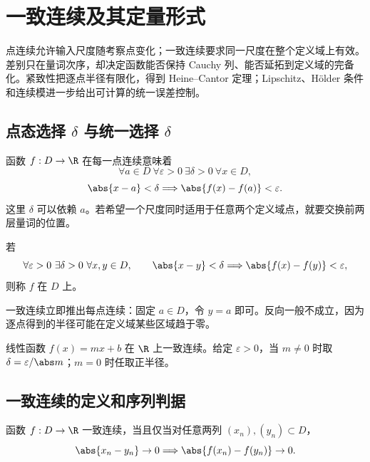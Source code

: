 \chapter{一致连续及其定量形式}
\label{chap:uniform-continuity}

\begin{chapterguide}
点连续允许输入尺度随考察点变化；一致连续要求同一尺度在整个定义域上有效。差别只在量词次序，却决定函数能否保持 Cauchy 列、能否延拓到定义域的完备化。紧致性把逐点半径有限化，得到 Heine--Cantor 定理；Lipschitz、Hölder 条件和连续模进一步给出可计算的统一误差控制。
\end{chapterguide}

\section{点态选择 \texorpdfstring{\(\delta\)}{delta} 与统一选择 \texorpdfstring{\(\delta\)}{delta}}

函数 \(f:D\to\R\) 在每一点连续意味着
\[
 \forall a\in D\ \forall\varepsilon>0\ \exists\delta>0\ \forall x\in D,
\]
\[
 \abs{x-a}<\delta\Longrightarrow\abs{f(x)-f(a)}<\varepsilon.
\]
这里 \(\delta\) 可以依赖 \(a\)。若希望一个尺度同时适用于任意两个定义域点，就要交换前两层量词的位置。

\begin{definition}[一致连续]
若
\[
 \forall\varepsilon>0\ \exists\delta>0\ \forall x,y\in D,\qquad
 \abs{x-y}<\delta\Longrightarrow\abs{f(x)-f(y)}<\varepsilon,
\]
则称 \(f\) 在 \(D\) 上。
\end{definition}

一致连续立即推出每点连续：固定 \(a\in D\)，令 \(y=a\) 即可。反向一般不成立，因为逐点得到的半径可能在定义域某些区域趋于零。

\begin{example}
线性函数 \(f(x)=mx+b\) 在 \(\R\) 上一致连续。给定 \(\varepsilon>0\)，当 \(m\ne0\) 时取 \(\delta=\varepsilon/\abs m\)；\(m=0\) 时任取正半径。
\end{example}

\section{一致连续的定义和序列判据}

\begin{theorem}[序列判据]
函数 \(f:D\to\R\) 一致连续，当且仅当对任意两列 \((x_n),(y_n)\subset D\)，
\[
 \abs{x_n-y_n}\to0
 \Longrightarrow
 \abs{f(x_n)-f(y_n)}\to0.
\]
\end{theorem}

